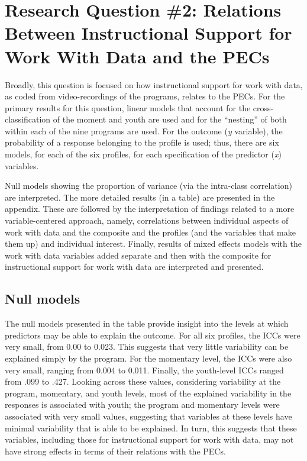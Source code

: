 \documentclass[]{book}
\theoremstyle{definition}
\theoremstyle{definition}
\theoremstyle{definition}
\theoremstyle{remark}
\begin{document}
\section{Research Question \#2: Relations Between Instructional Support
for Work With Data and the
PECs}\label{research-question-2-relations-between-instructional-support-for-work-with-data-and-the-pecs}

Broadly, this question is focused on how instructional support for work
with data, as coded from video-recordings of the programs, relates to
the PECs. For the primary results for this question, linear models that
account for the cross-classification of the moment and youth are used
and for the ``nesting'' of both within each of the nine programs are
used. For the outcome (\emph{y} variable), the probability of a response
belonging to the profile is used; thus, there are six models, for each
of the six profiles, for each specification of the predictor (\emph{x})
variables.

Null models showing the proportion of variance (via the intra-class
correlation) are interpreted. The more detailed results (in a table) are
presented in the appendix. These are followed by the interpretation of
findings related to a more variable-centered approach, namely,
correlations between individual aspects of work with data and the
composite and the profiles (and the variables that make them up) and
individual interest. Finally, results of mixed effects models with the
work with data variables added separate and then with the composite for
instructional support for work with data are interpreted and presented.

\subsection{Null models}\label{null-models}

The null models presented in the table provide insight into the levels
at which predictors may be able to explain the outcome. For all six
profiles, the ICCs were very small, from 0.00 to 0.023. This suggests
that very little variability can be explained simply by the program. For
the momentary level, the ICCs were also very small, ranging from 0.004
to 0.011. Finally, the youth-level ICCs ranged from .099 to .427.
Looking across these values, considering variability at the program,
momentary, and youth levels, most of the explained variability in the
responses is associated with youth; the program and momentary levels
were associated with very small values, suggesting that variables at
these levels have minimal variability that is able to be explained. In
turn, this suggests that these variables, including those for
instructional support for work with data, may not have strong effects in
terms of their relations with the PECs.
\end{document}
